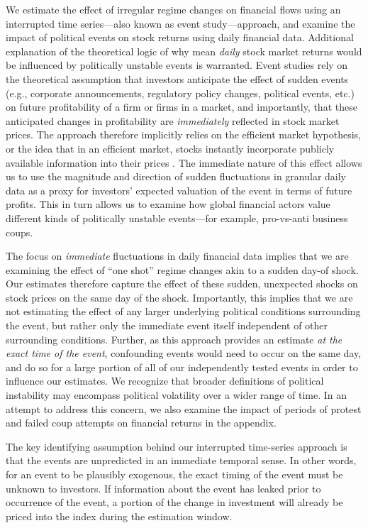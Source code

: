 \documentclass[12pt,final,fleqn]{article}
\theoremstyle{plain}
\begin{document}
We estimate the effect of irregular regime changes on financial flows using an interrupted time series---also known as event study---approach, and examine the impact of political events on stock returns using daily financial data. Additional explanation of the theoretical logic of why mean \textit{daily} stock market returns would be influenced by politically unstable events is warranted. Event studies rely on the theoretical assumption that investors anticipate the effect of sudden events (e.g., corporate announcements, regulatory policy changes, political events, etc.) on future profitability of a firm or firms in a market, and importantly, that these anticipated changes in profitability are \textit{immediately} reflected in stock market prices. The approach therefore implicitly relies on the efficient market hypothesis, or the idea that in an efficient market, stocks instantly incorporate publicly available information into their prices \citep{fama1965behavior, samuelson1965proof}. The immediate nature of this effect allows us to use the magnitude and direction of sudden fluctuations in granular daily data as a proxy for investors' expected valuation of the event in terms of future profits. This in turn allows us to examine how global financial actors value different kinds of politically unstable events---for example, pro-vs-anti business coups.

The focus on \textit{immediate} fluctuations in daily financial data implies that we are examining the effect of ``one shot'' regime changes akin to a sudden day-of shock. Our estimates therefore capture the effect of these sudden, unexpected shocks on stock prices on the same day of the shock. Importantly, this implies that we are not estimating the effect of any larger underlying political conditions surrounding the event, but rather only the immediate event itself independent of other surrounding conditions. Further, as this approach provides an estimate \textit{at the exact time of the event}, confounding events would need to occur on the same day, and do so for a large portion of all of our independently tested events in order to influence our estimates. We recognize that broader definitions of political instability may encompass political volatility over a wider range of time. In an attempt to address this concern, we also examine the impact of periods of protest and failed coup attempts on financial returns in the appendix.

The key identifying assumption behind our interrupted time-series approach is that the events are unpredicted in an immediate temporal sense. In other words, for an event to be plausibly exogenous, the exact timing of the event must be unknown to investors. If information about the event has leaked prior to occurrence of the event, a portion of the change in investment will already be priced into the index during the estimation window.
\end{document}
